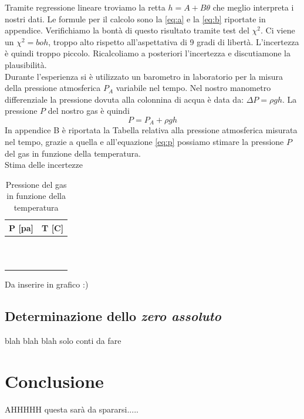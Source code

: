 Tramite regressione lineare troviamo la retta $h = A+B\theta$ che meglio interpreta i nostri dati. Le formule per il calcolo sono la \eqref{eq:a} e la \eqref{eq:b} riportate in appendice.
Verifichiamo la bontà di questo risultato tramite test del $\chi^2$. Ci viene un $\chi^2=boh$, troppo alto rispetto all'aspettativa di 9 gradi di libertà. L'incertezza è quindi troppo piccolo. Ricalcoliamo a posteriori l'incertezza e discutiamone la plausibilità.\\
\newline
Durante l'esperienza si è utilizzato un barometro in laboratorio per la misura della pressione atmosferica $P_A$ variabile nel tempo. Nel nostro manometro differenziale la pressione dovuta alla colonnina di acqua è data da: $\Delta P = \rho gh$. La pressione $P$ del nostro gas è quindi 
\begin{equation}
\label{eq:p}
P = P_A + \rho gh
\end{equation}
In appendice B è riportata la Tabella relativa alla pressione atmosferica misurata nel tempo, grazie a quella e all'equazione \eqref{eq:p} possiamo stimare la pressione $P$ del gas in funzione della temperatura.\\
Stima delle incertezze\\
\begin{table}[H]
	\centering
	\begin{tabular}{|c|c|} \hline
		\textbf{P {[pa]} } & \textbf{T {[\degree C]} }  \\ \hline
		 &   \\ \hline
		 &   \\ \hline
		 &   \\ \hline
		 &   \\ \hline
		 &   \\ \hline
		 &   \\ \hline
		 &   \\ \hline
		 &   \\ \hline
		 &   \\ \hline
		 &   \\ \hline
		 &   \\ \hline
	\end{tabular}
	\caption{Pressione del gas in funzione della temperatura}
\end{table}

Da inserire in grafico :)

\subsection{Determinazione dello \emph{zero assoluto}}
blah blah blah solo conti da fare 

\section{Conclusione}
AHHHHH questa sarà da spararsi.....
